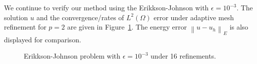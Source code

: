 \documentclass[final,leqno]{siamltex}
\newcommand{\nor}[1]{\left\| #1 \right\|}
\newcommand{\LRp}[1]{\left( #1 \right)}
\renewcommand{\L}{L^2\LRp{\Omega}}
\begin{document}
We continue to verify our method using the Erikkson-Johnson with $\epsilon = 10^{-3}$.  The solution $u$ and the convergence/rates of $\L$ error under adaptive mesh refinement for $p=2$ are given in Figure~\ref{fig:erikksonAdapt}.  The energy error $\nor{u-u_h}_E$ is also displayed for comparison.  
\begin{figure}[!h]
\centering
{}
\caption{Erikkson-Johnson problem with $\epsilon = 10^{-3}$ under 16 refinements.}
\label{fig:erikksonAdapt}
\end{figure}
\end{document}

